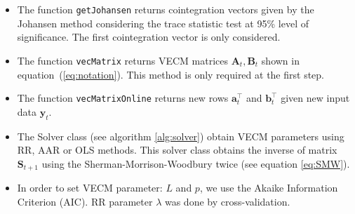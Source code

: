 \documentclass[twocolumn]{svjour3}          %
\begin{document}
\begin{itemize}
\item The function \texttt{getJohansen} returns cointegration vectors given by the
Johansen method considering the trace statistic test at 95\% level of
significance. The first cointegration vector is only considered.
\item The function \texttt{vecMatrix} returns VECM
matrices $\mathbf{A}_t,\mathbf{B}_t$ shown in equation~(\ref{eq:notation}). This
method is only required at the first step.
\item The function \texttt{vecMatrixOnline} returns new rows $\mathbf{a}_t^\top$ and
$\mathbf{b}_t^\top$ given new input data $\mathbf{y}_t$.
\item The Solver class (see algorithm \ref{alg:solver}) obtain VECM parameters  
using RR, AAR or OLS methods. This solver class obtains the inverse of matrix $\mathbf{S}_{t+1}$ using the  Sherman-Morrison-Woodbury twice (see equation \ref{eq:SMW}).
\item In order to set VECM parameter: $L$ and $p$, we use the Akaike Information
Criterion (AIC). RR parameter $\lambda$ was done by cross-validation.
\end{itemize}
\end{document}
